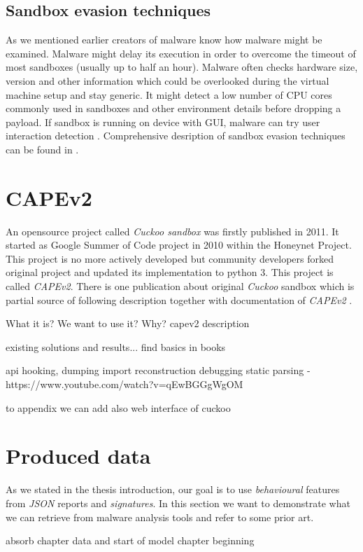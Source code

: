 \subsection{Sandbox evasion techniques}
As we mentioned earlier creators of malware know how malware might be examined. Malware might delay its execution in order to overcome the timeout of most sandboxes (usually up to half an hour). Malware often checks hardware size, version and other information which could be overlooked during the virtual machine setup and stay generic. It might detect a low number of CPU cores commonly used in sandboxes and other environment details before dropping a payload. If sandbox is running on device with GUI, malware can try user interaction detection \cite{Evolutio45:online}. Comprehensive desription of sandbox evasion techniques can be found in \cite{Afianian2018}.

\section{CAPEv2}
An opensource project called \emph{Cuckoo sandbox} was firstly published in 2011. It started as Google Summer of Code project in 2010 within the Honeynet Project. This project is no more actively developed but community developers forked original project and updated its implementation to python 3. This project is called \emph{CAPEv2}. There is one publication about original \emph{Cuckoo} sandbox \cite{Oktavianto2013} which is partial source of following description together with documentation of \emph{CAPEv2} \cite{CAPESand75:online}.

What it is? We want to use it? Why?
capev2 description

existing solutions and results...
find basics in books

api hooking, dumping import reconstruction debugging static parsing - https://www.youtube.com/watch?v=qEwBGGgWgOM

to appendix we can add also web interface of cuckoo


\section{Produced data}
As we stated in the thesis introduction, our goal is to use \emph{behavioural} features from \emph{JSON} reports and \emph{signatures}. In this section we want to demonstrate what we can retrieve from malware analysis tools and refer to some prior art.

absorb chapter data and start of model chapter beginning

